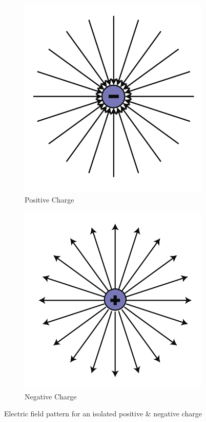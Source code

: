 \begin{figure}[htbp]
  \centering
  \begin{subfigure}[t]{0.3\textwidth}
      \includegraphics[width=\textwidth]{Images/11.4a}
      \caption{Positive Charge}
      \label{fig:11.5a}
  \end{subfigure}
  \begin{subfigure}[t]{0.3\textwidth}
      \includegraphics[width=\textwidth]{Images/11.4b}
      \caption{Negative Charge}
      \label{fig:11.5b}
  \end{subfigure}
  \caption[]{Electric field pattern for an isolated positive \& negative charge}
  \label{fig:11.5}
\end{figure}

